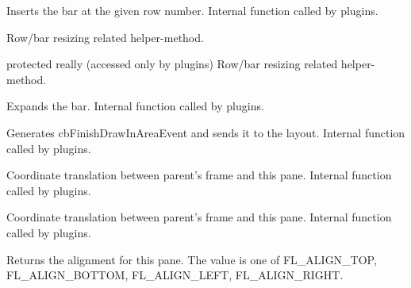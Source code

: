 
Inserts the bar at the given row number.
Internal function called by plugins.


\label{cbdockpanedrawhorizhandle}


Row/bar resizing related helper-method.


\label{cbdockpanedrawverthandle}


protected really (accessed only by plugins) Row/bar resizing related helper-method.


\label{cbdockpaneexpandbar}


Expands the bar.
Internal function called by plugins.


\label{cbdockpanefinishdrawinarea}


Generates cbFinishDrawInAreaEvent and sends it to the layout.
Internal function called by plugins.


\label{cbdockpaneframetopane}


Coordinate translation between parent's frame and this pane.
Internal function called by plugins.



Coordinate translation between parent's frame and this pane.
Internal function called by plugins.


\label{cbdockpanegetalignment}


Returns the alignment for this pane. The value is one of
FL\_ALIGN\_TOP, FL\_ALIGN\_BOTTOM, FL\_ALIGN\_LEFT, FL\_ALIGN\_RIGHT.


\label{cbdockpanegetbarinfobywindow}

